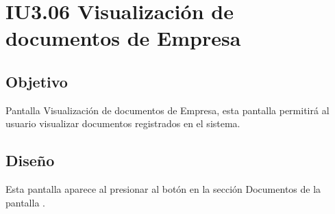 \newpage
\section{IU3.06 Visualización de documentos de Empresa}

\subsection{Objetivo}
	Pantalla Visualización de documentos de Empresa, esta pantalla permitirá al usuario visualizar documentos registrados en el sistema.
	


\subsection{Diseño}
	Esta pantalla aparece al presionar al botón  en la sección Documentos de la pantalla .

	
